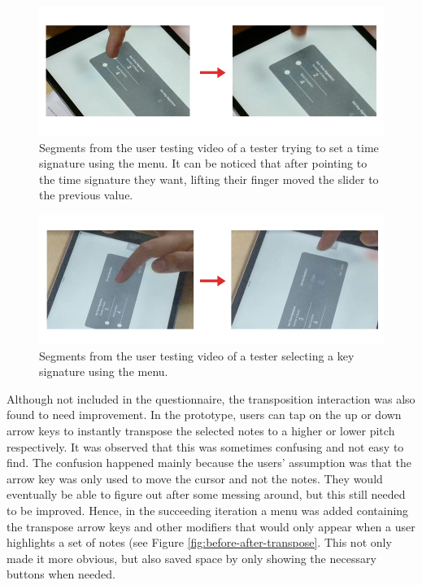 				\begin{figure}[h]
					\centering
					\includegraphics[scale=0.5]{figures/video_timesig.png}
				    \caption{Segments from the user testing video of a tester trying to set a time signature using the menu. It can be noticed that after pointing to the time signature they want, lifting their finger moved the slider to the previous value.}
				    \label{fig:video_timesig}
				\end{figure}

				\begin{figure}[h]
					\centering
					\includegraphics[scale=0.5]{figures/video_keysig.png}
				    \caption{Segments from the user testing video of a tester selecting a key signature using the menu.}
				    \label{fig:video_keysig}
				\end{figure}

				Although not included in the questionnaire, the transposition interaction was also found to need improvement. In the prototype, users can tap on the up or down arrow keys to instantly transpose the selected notes to a higher or lower pitch respectively. It was observed that this was sometimes confusing and not easy to find. The confusion happened mainly because the users' assumption was that the arrow key was only used to move the cursor and not the notes. They would eventually be able to figure out after some messing around, but this still needed to be improved. Hence, in the succeeding iteration a menu was added containing the transpose arrow keys and other modifiers that would only appear when a user highlights a set of notes (see Figure \ref{fig:before-after-transpose}. This not only made it more obvious, but also saved space by only showing the necessary buttons when needed.

